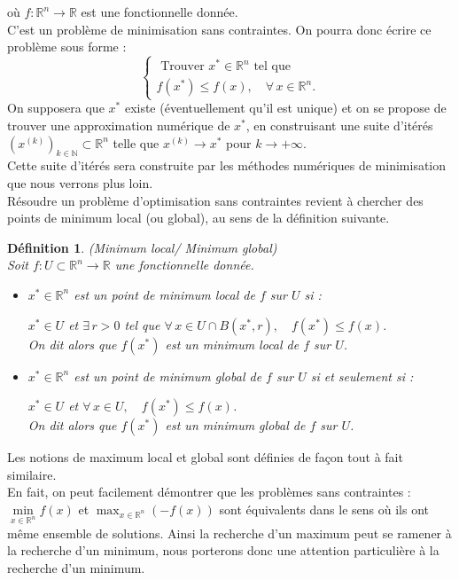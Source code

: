 \documentclass[12pt,a4paper,openay]{book}
\newtheorem{Def}{D\'efinition}[chapter]
\numberwithin{equation}{chapter}
\newcommand{\R}{\mathbb{R}}
\let\oldforall\forall
\renewcommand{\forall}{\oldforall\,}
\let\oldexists\exists
\renewcommand{\exists}{\oldexists\,}
\begin{document}
	o\`u $f: \R^n \to \R$ est une fonctionnelle donn\'ee.\\
	C'est un probl\`eme de minimisation sans contraintes. On pourra donc \'ecrire ce probl\`eme sous forme :
	$$
	\left\{\begin{array}{c}
	\text{ Trouver } x^* \in \R^n \text{ tel que } \\
	f(x^*) \leq f(x), \quad \forall x \in \R^n .
	\end{array}\right.
	$$	
	On supposera que $x^*$ existe (\'eventuellement qu'il est unique) et on se propose de trouver une approximation num\'erique de $x^*$, en construisant une suite d'it\'er\'es $\left(x^{(k)}\right)_{k \in \mathbb{N}} \subset \R^n$ telle que $ x^{(k)} \to x^*$ pour $k \to+\infty$.\\
	Cette suite d'it\'er\'es sera construite par les m\'ethodes num\'eriques de minimisation que nous verrons plus loin.\\
	R\'esoudre un probl\`eme d'optimisation sans contraintes revient \`a chercher des points de minimum local (ou global), au sens de la d\'efinition suivante.
	\begin{Def}
		(Minimum local/ Minimum global)\\
		Soit $f: U \subset \R^n \to \R$ une fonctionnelle donn\'ee.
		\begin{itemize}
			\item[$\bullet$] $x^* \in \R^n$ est un point de minimum local de $f$ sur $U$ si :
			
			$x^* \in U$ et $\exists r>0$ tel que $\forall x \in U \cap B\left(x^*,r\right), \quad f(x^*) \leq f(x)$.\\			
			On dit alors que $f(x^*)$ est un minimum local de $f$ sur  $U$.
			\item[$\bullet$] $x^* \in \R^n$ est un point de minimum global de $f$ sur $U$ si et seulement si :
			
			$x^* \in U$ et $\forall x \in U, \quad f(x^*) \leq f(x)$.\\		
			On dit alors que $f(x^*)$ est un minimum global de $f$ sur  $U$.
		\end{itemize}
	\end{Def}
	Les notions de maximum local et global sont d\'efinies de fa\c{c}on tout \`a fait similaire.\\
	En fait, on peut facilement d\'emontrer que les probl\`emes sans contraintes : $\min\limits_{x \in \R^n} f(x)$ et $\max _{x \in \R^n}\left(-f(x)\right)$
	sont \'equivalents dans le sens o\`u ils ont m\^eme ensemble de solutions.
	Ainsi la recherche d'un maximum peut se ramener \`a la recherche d'un minimum, nous porterons donc une attention particuli\`ere \`a la recherche d'un minimum.
	
\end{document}

